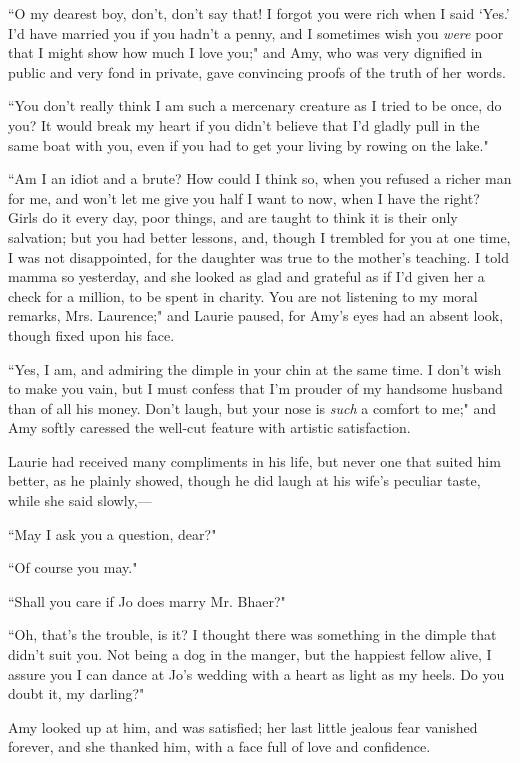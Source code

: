 ``O my dearest boy, don't, don't say
that! I forgot you were rich when I said
`Yes.' I'd have married
you if you hadn't a penny, and I sometimes wish you
\emph{were} poor that I might show how much I love you;" and Amy, who
was very dignified in public and very fond in private, gave convincing
proofs of the truth of her words.

``You don't really think I am such a mercenary creature
as I tried to be once, do you? It would break my heart if you
didn't believe that I'd gladly pull in
the same boat with you, even if you had to get your living by rowing on
the lake."

``Am I an idiot and a brute? How could I think so, when you refused a
richer man for me, and won't let me give you half I want
to now, when I have the right? Girls do it every day, poor things, and
are taught to think it is their only salvation; but you had better
lessons, and, though I trembled for you at one time, I was not
disappointed, for the daughter was true to the mother's
teaching. I told mamma so yesterday, and she looked as glad and grateful
as if I'd given her a check for a million, to be spent
in charity. You are not listening to my moral remarks, Mrs. Laurence;"
and Laurie paused, for Amy's eyes had an absent look,
though fixed upon his face.

``Yes, I am, and admiring the dimple in your chin at the same time. I
don't wish to make you vain, but I must confess that
I'm prouder of my handsome husband than of all his
money. Don't laugh, but your nose is \emph{such} a
comfort to me;" and Amy softly caressed the well-cut feature with
artistic satisfaction.

Laurie had received many compliments in his life, but never one that
suited him better, as he plainly showed, though he did laugh at his
wife's peculiar taste, while she said slowly,---

``May I ask you a question, dear?"

``Of course you may."

``Shall you care if Jo does marry Mr. Bhaer?"

``Oh, that's the trouble, is it? I thought there was
something in the dimple that didn't suit you. Not being
a dog in the manger, but the happiest fellow alive, I assure you I can
dance at Jo's wedding with a heart as light as my heels.
Do you doubt it, my darling?"

Amy looked up at him, and was satisfied; her last little jealous fear
vanished forever, and she thanked him, with a face full of love and
confidence.

